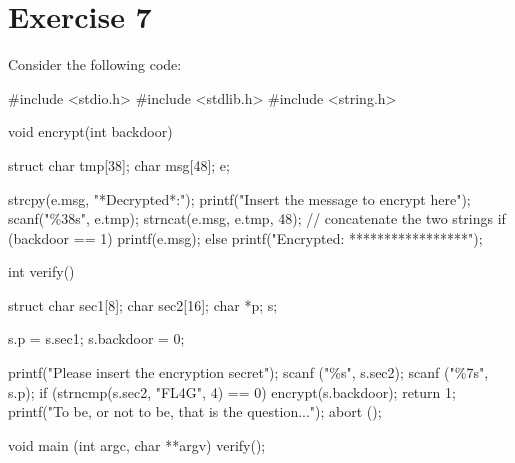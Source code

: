 \section{Exercise 7}

Consider the following code: 
\begin{verbnobox}[\verbarg]
#include <stdio.h>
#include <stdlib.h>
#include <string.h>

void encrypt(int backdoor){
    struct{
        char tmp[38];
        char msg[48];
    } e;

    strcpy(e.msg, "*Decrypted*:");
    printf("Insert the message to encrypt here\n");
    scanf("\%38s", e.tmp);
    strncat(e.msg, e.tmp, 48); // concatenate the two strings
    if (backdoor == 1){
        printf(e.msg);
    }else{
        printf("Encrypted: *****************\n");
    }
}

int verify(){
    struct{
        char sec1[8];
        char sec2[16];
        char *p;
    } s;

    s.p = s.sec1;
    s.backdoor = 0;

    printf("Please insert the encryption secret\n");
    scanf ("\%s", s.sec2);
    scanf ("\%7s", s.p);
    if (strncmp(s.sec2, "FL4G", 4) == 0) {
        encrypt(s.backdoor);
        return 1;
    }
    printf("To be, or not to be, that is the question...\n");
    abort ();
}

void main (int argc, char **argv){
    verify();
}
\end{verbnobox}
